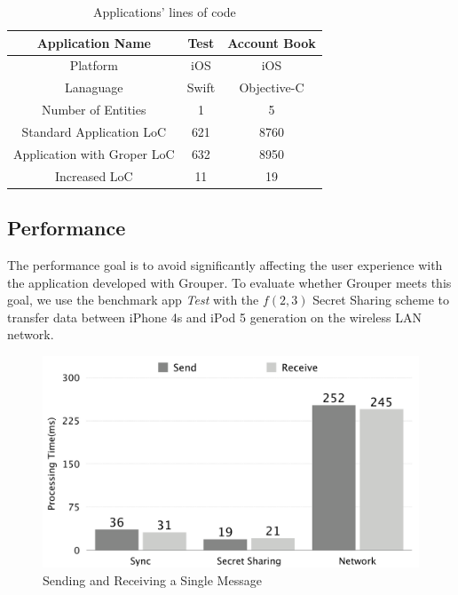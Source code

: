 \documentclass[twocolumn,10pt]{article}
\begin{document}
\begin{table}[tbp]
	\footnotesize
	\centering  
	\begin{tabular}{c|c|c}
		\hline
		Application Name           & Test  & Account Book \\ \hline
		Platform            & iOS   & iOS          \\ \hline
		Lanaguage           & Swift & Objective-C  \\ \hline
		Number of Entities  & 1     & 5            \\ \hline
		Standard Application LoC     & 621   & 8760         \\ \hline
		Application with Groper LoC     & 632   & 8950         \\ \hline
		Increased LoC & 11    & 19           \\ \hline
	\end{tabular}
	\caption{Applications' lines of code}
\end{table}

\subsection{Performance}

The performance goal is to avoid significantly affecting the user experience with the application developed with Grouper. To evaluate whether Grouper meets this goal, we use the benchmark app \emph{Test} with the $f(2, 3)$ Secret Sharing scheme to transfer data between iPhone 4s and iPod 5 generation on the wireless LAN network.

\begin{figure}[t]
	\centering
	\includegraphics[scale=0.12]{processing1}
	\caption{Sending and Receiving a Single Message}
\end{figure}
\end{document}
